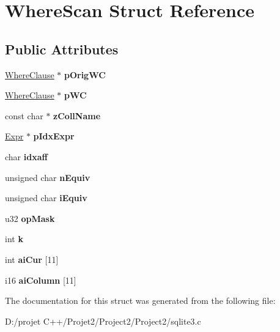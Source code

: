 \hypertarget{struct_where_scan}{}\section{Where\+Scan Struct Reference}
\label{struct_where_scan}
\subsection*{Public Attributes}
\begin{DoxyCompactItemize}
\item 
\mbox{\label{struct_where_scan_a848dc138a80d4e16ce5044e3d3125831}} 
\mbox{\hyperlink{struct_where_clause}{Where\+Clause}} $\ast$ {\bfseries p\+Orig\+WC}
\item 
\mbox{\label{struct_where_scan_a255e78bbf5eb2aafe98d5f0285c1987c}} 
\mbox{\hyperlink{struct_where_clause}{Where\+Clause}} $\ast$ {\bfseries p\+WC}
\item 
\mbox{\label{struct_where_scan_aa21062fab71aadb240a866ff0b5e1a98}} 
const char $\ast$ {\bfseries z\+Coll\+Name}
\item 
\mbox{\label{struct_where_scan_ae93d54128df8188241c2432b0c394e64}} 
\mbox{\hyperlink{struct_expr}{Expr}} $\ast$ {\bfseries p\+Idx\+Expr}
\item 
\mbox{\label{struct_where_scan_ada63a4e977c20a66b858e4b182ff8f87}} 
char {\bfseries idxaff}
\item 
\mbox{\label{struct_where_scan_a80ee79b4e2809c0310a892e93ba5dcfe}} 
unsigned char {\bfseries n\+Equiv}
\item 
\mbox{\label{struct_where_scan_a52812709e4b6257a3084dd091ddaf568}} 
unsigned char {\bfseries i\+Equiv}
\item 
\mbox{\label{struct_where_scan_a52f27b144ffed79df3400868e52dd583}} 
u32 {\bfseries op\+Mask}
\item 
\mbox{\label{struct_where_scan_a51bec89116185e0a611cd4d7fed8847c}} 
int {\bfseries k}
\item 
\mbox{\label{struct_where_scan_a0795799165cb58df1402063f03daf1a6}} 
int {\bfseries ai\+Cur} \mbox{[}11\mbox{]}
\item 
\mbox{\label{struct_where_scan_a5a55fc1ad5f48ef922ea89c9603f8f38}} 
i16 {\bfseries ai\+Column} \mbox{[}11\mbox{]}
\end{DoxyCompactItemize}


The documentation for this struct was generated from the following file\+:\begin{DoxyCompactItemize}
\item 
D\+:/projet C++/\+Projet2/\+Project2/\+Project2/sqlite3.\+c\end{DoxyCompactItemize}
